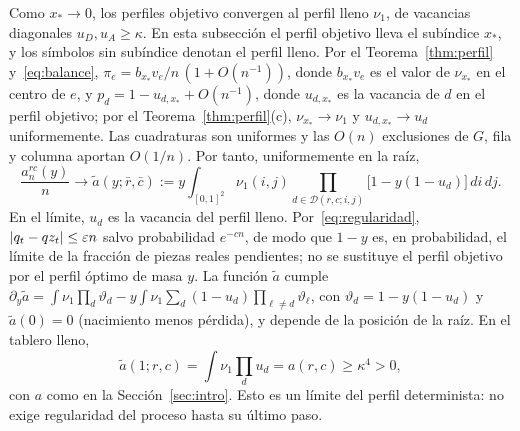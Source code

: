 Como $x_*\to0$, los perfiles objetivo convergen al perfil lleno $\nu_1$, de vacancias
diagonales $u_D,u_A\ge\kappa$. En esta subsección el perfil objetivo lleva el subíndice $x_*$, y
los símbolos sin subíndice denotan el perfil lleno. Por el Teorema~\ref{thm:perfil}
y~\eqref{eq:balance}, $\pi_e=b_{x_*}v_e/n\,(1+O(n^{-1}))$, donde $b_{x_*}v_e$ es el valor de
$\nu_{x_*}$ en el centro de $e$, y $p_d=1-u_{d,x_*}+O(n^{-1})$, donde $u_{d,x_*}$ es la vacancia
de $d$ en el perfil objetivo; por el Teorema~\ref{thm:perfil}(c), $\nu_{x_*}\to\nu_1$ y
$u_{d,x_*}\to u_d$ uniformemente. Las cuadraturas son uniformes y las $O(n)$ exclusiones de $G$,
fila y columna aportan $O(1/n)$. Por tanto, uniformemente en la raíz,
\begin{equation}\label{eq:trayectoria}
 \frac{a_n^{rc}(y)}n\longrightarrow\tilde a(y;\bar r,\bar c):=
 y\int_{[0,1]^2}\nu_1(i,j)\prod_{d\in\mathcal D(r,c;i,j)}\bigl[1-y(1-u_d)\bigr]\,di\,dj .
\end{equation}
En el límite, $u_d$ es la vacancia del perfil lleno. Por~\eqref{eq:regularidad}, $|q_t-qz_t|\le\varepsilon n$ salvo
probabilidad $e^{-cn}$, de modo que $1-y$ es, en probabilidad, el límite de la fracción
de piezas reales pendientes; no se sustituye el perfil objetivo por el perfil óptimo de masa
$y$. La
función $\tilde a$ cumple $\partial_y\tilde a=\int\nu_1\prod_d\vartheta_d
-y\int\nu_1\sum_d(1-u_d)\prod_{\ell\ne d}\vartheta_\ell$, con $\vartheta_d=1-y(1-u_d)$ y
$\tilde a(0)=0$ (nacimiento menos pérdida), y depende de la posición de la raíz. En el tablero
lleno,
\begin{equation}\label{eq:a_infinito}
 \tilde a(1;r,c)=\int\nu_1\prod_du_d=a(r,c)\ge\kappa^4>0,
\end{equation}
con $a$ como en la Sección~\ref{sec:intro}. Esto es un límite del perfil determinista: no exige
regularidad del proceso hasta su último paso.
